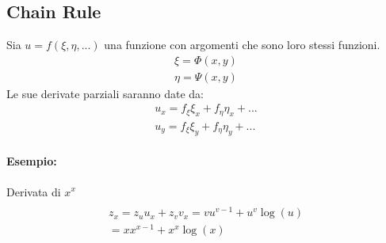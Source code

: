 \subsection{Chain Rule}

Sia $u = f(\xi, \eta, ...)$ una funzione con argomenti che sono loro stessi funzioni.
\begin{align*}
	\xi = \Phi(x,y) \\
	\eta = \Psi(x,y)
\end{align*}
Le sue derivate parziali saranno date da:
\begin{align*}
	u_x = f_\xi \xi_x + f_\eta \eta_x + . . . \\
	u_y = f_\xi \xi_y + f_\eta \eta_y + . . .
\end{align*}

\paragraph{Esempio:}
Derivata di $x^x$
\begin{align*}
	[u = x, v = x, z = u^v] \\
	z_x = z_u u_x + z_v v_x = vu^{v-1} + u^v\log(u) \\
	= xx^{x-1} + x^x\log(x)
\end{align*}



